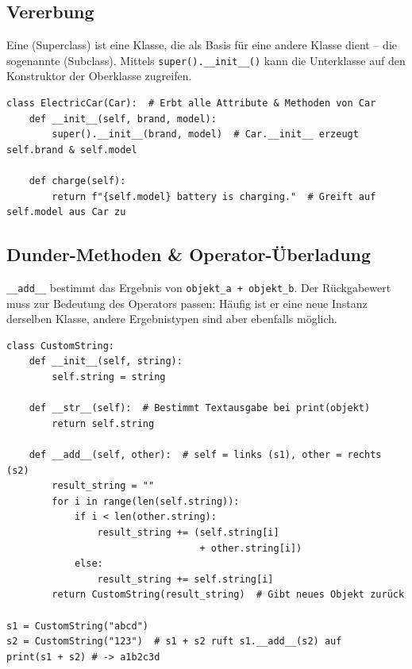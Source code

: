 \subsection{Vererbung}\label{sec:02-vererbung}
\begin{defbox}
Eine  (Superclass) ist eine Klasse, die als Basis für eine andere Klasse dient – die sogenannte  (Subclass). Mittels \verb|super().__init__()| kann die Unterklasse auf den Konstruktor der Oberklasse zugreifen.
\end{defbox}
\begin{codebox}
\begin{lstlisting}[style=CodeExpert]
class ElectricCar(Car):  # Erbt alle Attribute & Methoden von Car
    def __init__(self, brand, model):
        super().__init__(brand, model)  # Car.__init__ erzeugt self.brand & self.model

    def charge(self):
        return f"{self.model} battery is charging."  # Greift auf self.model aus Car zu
\end{lstlisting}
\end{codebox}

\subsection{Dunder-Methoden \& Operator-Überladung}\label{sec:02-klasseninterne-funktionen-implementieren}
\begin{statementbox}[Rückgabewert]
\texttt{\_\_add\_\_} bestimmt das Ergebnis von \texttt{objekt\_a + objekt\_b}. Der Rückgabewert muss zur Bedeutung des Operators passen: Häufig ist er eine neue Instanz derselben Klasse, andere Ergebnistypen sind aber ebenfalls möglich.
\end{statementbox}
\begin{codebox}
\begin{lstlisting}[style=CodeExpert]
class CustomString:
    def __init__(self, string):
        self.string = string

    def __str__(self):  # Bestimmt Textausgabe bei print(objekt)
        return self.string

    def __add__(self, other):  # self = links (s1), other = rechts (s2)
        result_string = ""
        for i in range(len(self.string)):
            if i < len(other.string):
                result_string += (self.string[i]
                                  + other.string[i])
            else:
                result_string += self.string[i]
        return CustomString(result_string)  # Gibt neues Objekt zurück

s1 = CustomString("abcd")
s2 = CustomString("123")  # s1 + s2 ruft s1.__add__(s2) auf
print(s1 + s2) # -> a1b2c3d
\end{lstlisting}
\end{codebox}



